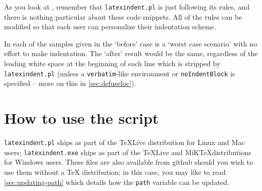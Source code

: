 \documentclass[8pt]{article}
\newenvironment{sidebyside}{\begin{adjustwidth}{-3cm}{1cm}}{\end{adjustwidth}}
\begin{document}
As you look at , remember
that \texttt{latexindent.pl} is just following its rules, and there is nothing
particular about these code snippets. All of the rules can be modified
so that each user can personalize their indentation scheme.

In each of the samples given in 
the `before' case is a `worst case scenario' with no effort to make indentation. The `after'
result would be the same, regardless of the leading white space at the beginning of
each line which is stripped by \texttt{latexindent.pl} (unless a \texttt{verbatim}-like
environment or \texttt{noIndentBlock} is specified -- more on this in \cref{sec:defuseloc}).

\begin{sidebyside}
  \begin{minipage}{.6\textwidth}
  \end{minipage}%
  \begin{minipage}{.6\textwidth}
  \end{minipage}%

  \begin{minipage}{.6\textwidth}
  \end{minipage}%
  \begin{minipage}{.6\textwidth}
  \end{minipage}%

  \begin{minipage}{.6\textwidth}
  \end{minipage}%
  \begin{minipage}{.6\textwidth}
  \end{minipage}%
\end{sidebyside}


\section{How to use the script}
\texttt{latexindent.pl} ships as part of the \TeX Live distribution for
Linux and Mac users; \texttt{latexindent.exe} ships as part of the \TeX Live
and MiK\TeX distributions for Windows users. These files are also available
from github \cite{latexindent-home} should you wish to use them without
a \TeX{} distribution; in this case, you may like to read \vref{sec:updating-path}
which details how the \texttt{path} variable can be updated.
\end{document}
